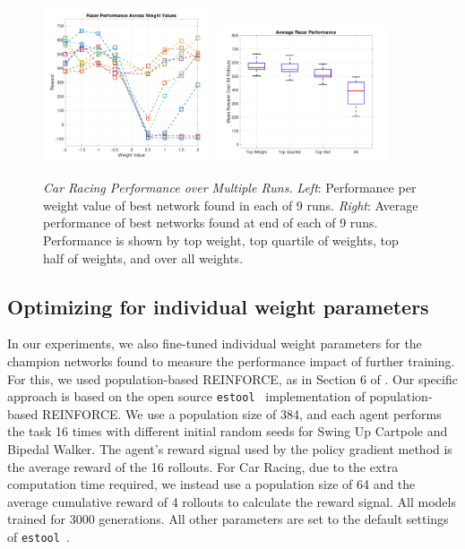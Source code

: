 \begin{figure}[ht!]
\vskip -0.05in %
    \centering        
    \includegraphics[width=0.45\textwidth]{supplemental/race_data/fitByWeight.pdf}   
    \includegraphics[width=0.45\textwidth]{supplemental/race_data/fitByWeightBox.pdf}   
\vskip -0.05in %
    \caption      
    {     
	\textit{Car Racing Performance over Multiple Runs.}
	\newline
	\textit{Left}: Performance per weight value of best network found in each of 9 runs.
	\newline
	\textit{Right}: Average performance of best networks found at end of each of 9 runs. Performance is shown by top weight, top quartile of weights, top half of weights, and over all weights.
    }         
    \label{fig:race}
\vskip -0.15in %
\end{figure}

\newpage


\newpage

\subsection{Optimizing for individual weight parameters}

In our experiments, we also fine-tuned individual weight parameters for the champion networks found to measure the performance impact of further training. For this, we used population-based REINFORCE, as in Section 6 of \cite{williams1992simple}. Our specific approach is based on the open source \texttt{estool}~\cite{ha2017evolving} implementation of population-based REINFORCE. We use a population size of 384, and each agent performs the task 16 times with different initial random seeds for Swing Up Cartpole and Bipedal Walker. The agent’s reward signal used by the policy gradient method is the average reward of the 16 rollouts. For Car Racing, due to the extra computation time required, we instead use a population size of 64 and the average cumulative reward of 4 rollouts to calculate the reward signal. All models trained for 3000 generations. All other parameters are set to the default settings of \texttt{estool}~\cite{ha2017evolving}.

